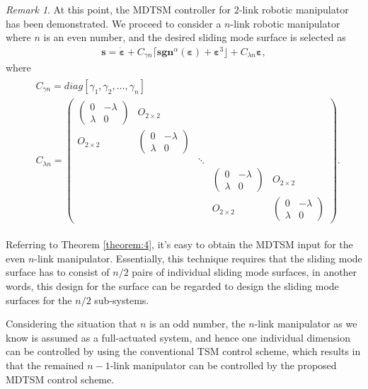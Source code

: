 \documentclass[3p]{elsarticle}
\theoremstyle{plain}
\theoremstyle{remark}
\newtheorem{myrem}{Remark}
\begin{document}
\begin{myrem}
At this point, the MDTSM controller for $2$-link robotic manipulator has been demonstrated. We proceed to consider a $n$-link robotic manipulator where $n$ is an even number, and the desired sliding mode  surface is selected as
\begin{align}
\bm s = \dot{\bm \varepsilon}+C_{\gamma n}\lceil\bm{sgn}^\alpha(\bm \varepsilon)+\bm\varepsilon^3\rfloor+C_{\lambda n}{\bm\varepsilon},
\end{align}
where
\begin{align}
\begin{split}
&C_{\gamma n}=diag[\gamma_1,\gamma_2,\ldots,\gamma_n]\\
&C_{\lambda n}=
\begin{pmatrix}
\begin{pmatrix}
0 &-\lambda\\ \lambda &0
\end{pmatrix} &O_{2\times 2} & & &\\
O_{2\times 2} &\begin{pmatrix}
0 &-\lambda\\ \lambda &0
\end{pmatrix} & & &\\
& &\ddots & &\\
& & &\begin{pmatrix}
0 &-\lambda\\ \lambda &0
\end{pmatrix} &O_{2\times 2}\\
& & &O_{2\times 2} &\begin{pmatrix}
0 &-\lambda\\ \lambda &0
\end{pmatrix}
\end{pmatrix}.
\end{split}
\end{align}\par
Referring to Theorem \ref{theorem:4}, it's easy to obtain the MDTSM input for the even $n$-link manipulator. Essentially, this technique requires that the sliding mode  surface has to consist of $n/2$ pairs of individual sliding mode  surfaces, in another words, this design for the surface can be regarded to design the sliding mode  surfaces for the $n/2$ sub-systems.\par
Considering the situation that $n$ is an odd number, the $n$-link manipulator as we know is assumed as a full-actuated system, and hence one individual dimension can be controlled by using the conventional TSM control scheme, which results in that the remained $n-1$-link manipulator can be controlled by the proposed MDTSM control scheme.
\end{myrem}
\end{document}

